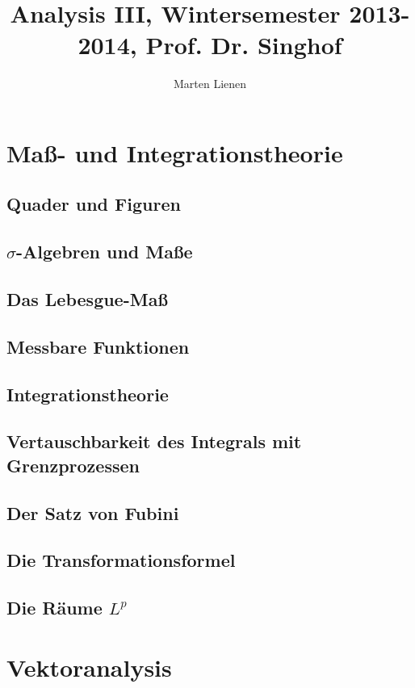 \documentclass[10pt,a4paper]{report}
\title{Analysis III, Wintersemester 2013-2014, Prof. Dr. Singhof}
\author{Marten Lienen}
\begin{document}
\maketitle

\chapter{Maß- und Integrationstheorie}

\section{Quader und Figuren}

\section{$\sigma$-Algebren und Maße}

\section{Das Lebesgue-Maß}

\section{Messbare Funktionen}

\section{Integrationstheorie}

\section{Vertauschbarkeit des Integrals mit Grenzprozessen}

\section{Der Satz von Fubini}

\section{Die Transformationsformel}

\section{Die Räume $L^{p}$}

\chapter{Vektoranalysis}
\end{document}
